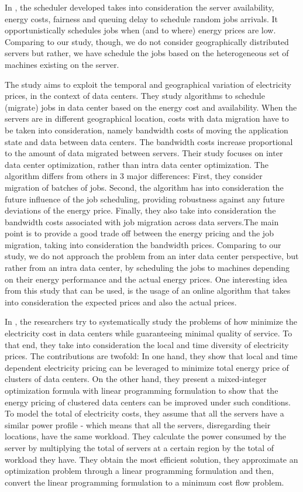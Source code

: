 In \cite{EFF_JOB_SCHEDULING}, the scheduler developed takes into consideration
the server availability, energy costs, fairness and queuing delay to schedule
random jobs arrivals. It opportunistically schedules jobs when (and to where) 
energy prices are low. Comparing to our study, though, we do not consider geographically distributed 
servers but rather, we have schedule the jobs based on the heterogeneous set of 
machines existing on the server.


The \cite{MIGRATION_CLOUD} study aims to exploit the temporal and geographical variation of
electricity prices, in the context of data centers. They study algorithms to
schedule (migrate) jobs in data center based on the energy cost and
availability. When the servers are in different geographical location, costs with data
migration have to be taken into consideration, namely bandwidth costs of moving
the application state and data between data centers. The bandwidth costs
increase proportional to the amount of data migrated between servers. Their study focuses on inter data center optimization, rather than intra data
center optimization. The algorithm differs from others in 3 major differences: First, they consider
migration of batches of jobs. Second, the algorithm has into consideration the
future influence of the job scheduling, providing robustness against any future
deviations of the energy price. Finally, they also take into consideration the 
bandwidth costs associated with job migration across data servers.The main point is to provide a good trade off between the energy pricing and the
job migration, taking into consideration the bandwidth prices. Comparing to our study, we do not approach the problem from an inter data center
perspective, but rather from an intra data center, by scheduling the jobs to
machines depending on their energy performance and the actual energy prices. One
interesting idea from this study that can be used, is the usage of an online
algorithm that takes into consideration the expected prices and also the actual
prices.


In \cite{MINIMIZING_DIST}, the researchers try to systematically study the problems of how
minimize the electricity cost in data centers while guaranteeing minimal quality
of service. To that end, they take into consideration the local and time diversity 
of electricity prices. The contributions are twofold: In one hand, they show that local and time
dependent electricity pricing can be leveraged to minimize total energy price
of clusters of data centers. On the other hand, they present a mixed-integer
optimization formula with linear programming formulation to show that the energy
pricing of clustered data centers can be improved under such conditions. To model the total of electricity costs, they assume that all the servers have a
similar power profile - which means that all the servers, disregarding their
locations, have the same workload. They calculate the power consumed by the
server by multiplying the total of servers at a certain region by the total of
workload they have.  They obtain the most efficient solution, they approximate an optimization
problem through a linear programming formulation and then, convert the linear
programming formulation to a minimum cost flow problem. 

